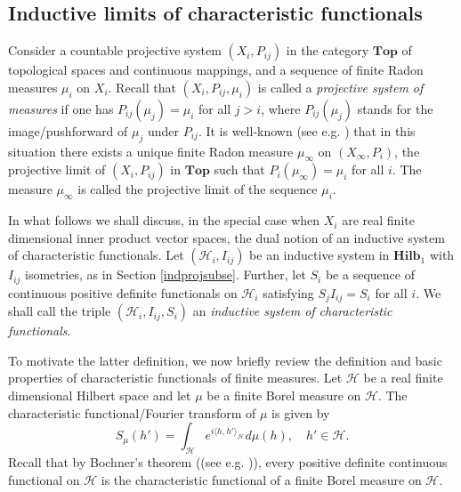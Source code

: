 \documentclass[11pt,reqno]{amsart}
\numberwithin{equation}{section}
\theoremstyle{remark}
\theoremstyle{rmdefinition}
\begin{document}
\subsection{Inductive limits of characteristic functionals}\label{Indlimfuncsec}
Consider a countable projective system $(X_i,P_{ij})$ in the category $\mathbf{Top}$ of topological spaces and continuous mappings, and a sequence of finite Radon measures $\mu_i$ on $X_i$. Recall that $(X_i,P_{ij},\mu_i)$ is called a {\em projective system of measures} if one has $P_{ij}(\mu_j)=\mu_i$ for all $j>i$, where $P_{ij}(\mu_j)$ stands for the image/pushforward of $\mu_j$ under $P_{ij}$. It is well-known (see e.g. \cite[Part I, Chapter I, \S 10]{Sz}) that in this situation there exists a unique finite Radon measure $\mu_{\infty}$ on $(X_{\infty},P_i)$, the projective limit of $(X_i,P_{ij})$ in $\mathbf{Top}$ such that $P_i(\mu_{\infty})=\mu_i$ for all $i$. The measure $\mu_{\infty}$ is called the projective limit of the sequence $\mu_i$.

In what follows we shall discuss, in the special case when $X_i$ are real finite dimensional inner product vector spaces, the dual notion of an inductive system of characteristic functionals. Let $(\mathcal{H}_i,I_{ij})$ be an inductive system in $\mathbf{Hilb}_1$ with $I_{ij}$ isometries, as in Section \ref{indprojsubse}. Further, let $S_i$ be a sequence of continuous positive definite functionals on $\mathcal{H}_i$ satisfying $S_jI_{ij}=S_i$ for all $i$. We shall call the triple $(\mathcal{H}_i,I_{ij},S_i)$ an {\em inductive system of characteristic functionals}.

To motivate the latter definition, we now briefly review the definition and basic properties of characteristic functionals of  finite measures. Let $\mathcal{H}$ be a real finite dimensional Hilbert space and let $\mu$ be a finite Borel measure on 
$\mathcal{H}$. The characteristic functional/Fourier transform of $\mu$ is given by 
$$S_{\mu}(h')=\int_{\mathcal{H}}e^{i\langle h, h' \rangle_{\mathcal{H}}} d\mu(h), \quad h' \in \mathcal{H}.$$
Recall that by Bochner's theorem ((see e.g. \cite[Theorem 7.13.1]{B})), every positive definite continuous functional on $\mathcal{H}$ is the characteristic functional of a finite Borel measure on  $\mathcal{H}$.
\end{document}
